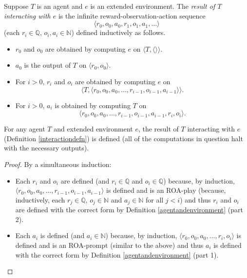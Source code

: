 \documentclass[runningheads]{llncs}
\begin{document}
\begin{definition}
\label{interactiondefn}
    Suppose $T$ is an agent and $e$ is an extended environment.
    The \emph{result of $T$ interacting with $e$} is the infinite
    reward-observation-action sequence
    \[\langle r_0,o_0,a_0,r_1,o_1,a_1,\ldots\rangle\]
    (each $r_i\in\mathbb Q$, $o_i,a_i\in\mathbb N$)
    defined inductively as follows.
    \begin{itemize}
        \item $r_0$ and $o_0$ are obtained by computing $e$ on
        $\langle T,\langle\rangle\rangle$.
        \item $a_0$ is the output of $T$ on $\langle r_0,o_0\rangle$.
        \item For $i>0$, $r_i$ and $o_i$ are obtained by computing $e$
        on
        \[\langle T,\langle r_0,o_0,a_0,\ldots,r_{i-1},o_{i-1},a_{i-1}\rangle\rangle.\]
        \item For $i>0$, $a_i$ is obtained by computing $T$ on
        \[\langle r_0,o_0,a_0,\ldots,r_{i-1},o_{i-1},a_{i-1},r_i,o_i\rangle.\]
    \end{itemize}
\end{definition}

\begin{lemma}
    For any agent $T$ and extended environment $e$, the result of $T$ interacting
    with $e$ (Definition \ref{interactiondefn}) is defined (all of the computations
    in question halt with the necessary outputs).
\end{lemma}

\begin{proof}
    By a simultaneous induction:
    \begin{itemize}
        \item
        Each $r_i$ and $o_i$ are defined (and $r_i\in\mathbb Q$
        and $o_i\in\mathbb Q$) because, by induction,
        $\langle r_0,o_0,a_0,\ldots,r_{i-1},o_{i-1},a_{i-1}\rangle$
        is defined and is an ROA-play (because, inductively,
        each $r_j\in\mathbb Q$, $o_j\in\mathbb N$ and $a_j\in\mathbb N$
        for all $j<i$) and thus
        $r_i$ and $o_i$ are defined with the correct form by
        Definition \ref{agentandenvironment} (part 2).
        \item
        Each $a_i$ is defined (and $a_i\in\mathbb N$) because, by induction,
        $\langle r_0,o_0,a_0,\ldots,r_i,o_i\rangle$
        is defined and is an ROA-prompt (similar to the above) and thus
        $a_i$ is defined with the correct form by Definition
        \ref{agentandenvironment} (part 1).
    \end{itemize}
\end{proof}
\end{document}

